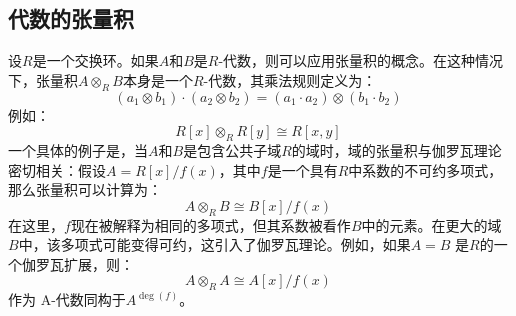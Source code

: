 \subsection{代数的张量积}
设\( R \)是一个交换环。如果\( A \)和\( B \)是\( R \)-代数，则可以应用张量积的概念。在这种情况下，张量积\( A \otimes_R B \)本身是一个\( R \)-代数，其乘法规则定义为：
\[
(a_1 \otimes b_1) \cdot (a_2 \otimes b_2) = (a_1 \cdot a_2) \otimes (b_1 \cdot b_2)~
\]
例如：
\[
R[x] \otimes_R R[y] \cong R[x, y]~
\]
一个具体的例子是，当\(A\)和\(B\)是包含公共子域\(R\)的域时，域的张量积与伽罗瓦理论密切相关：假设\(A = R[x]/f(x)\)，其中\(f\)是一个具有\(R\)中系数的不可约多项式，那么张量积可以计算为：
\[
A \otimes_R B \cong B[x] / f(x)~
\]
在这里，\(f\)现在被解释为相同的多项式，但其系数被看作\(B\)中的元素。在更大的域\(B\)中，该多项式可能变得可约，这引入了伽罗瓦理论。例如，如果\(A = B\) 是\(R\)的一个伽罗瓦扩展，则：
\[
A \otimes_R A \cong A[x] / f(x)~
\]
作为 A-代数同构于\(A^{\operatorname{deg}(f)}\)。

